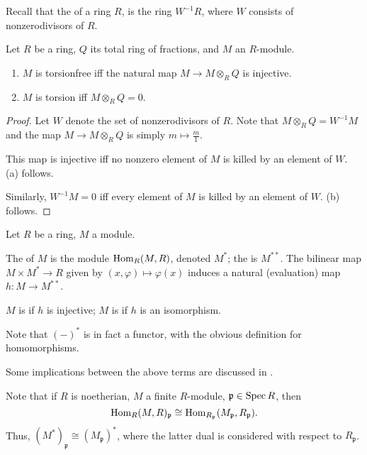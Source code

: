 \documentclass[12pt]{article}
\begin{document}
Recall that the  of a ring $R$, is the ring $W^{-1} R$, where $W$ consists of nonzerodivisors of $R$.
\begin{prop}
	Let $R$ be a ring, $Q$ its total ring of fractions, and $M$ an $R$-module.
	\begin{enumerate}[label=(\alph*)]
		\item $M$ is torsionfree iff the natural map $M \to M \otimes_{R} Q$ is injective.
		\item $M$ is torsion iff $M \otimes_{R} Q = 0$.
	\end{enumerate}
\end{prop}
\begin{proof} 
	Let $W$ denote the set of nonzerodivisors of $R$. Note that $M \otimes_{R} Q = W^{-1} M$ and the map $M \to M \otimes_{R} Q$ is simply $m \mapsto \frac{m}{1}$. 

	This map is injective iff no nonzero element of $M$ is killed by an element of $W$. (a) follows.

	Similarly, $W^{-1} M = 0$ iff every element of $M$ is killed by an element of $W$. (b) follows.
\end{proof}

\begin{defn}
	Let $R$ be a ring, $M$ a module. 

	The  of $M$ is the module $\operatorname{Hom}_{R}(M, R)$, denoted $M^{\ast}$; the  is $M^{\ast \ast}$. \newline
	The bilinear map $M \times M^{\ast} \to R$ given by $(x, \varphi) \mapsto \varphi(x)$ induces a natural (evaluation) map $h : M \to M^{\ast \ast}$. 

	$M$ is  if $h$ is injective; $M$ is  if $h$ is an isomorphism.
\end{defn}
Note that $(-)^{\ast}$ is in fact a functor, with the obvious definition for homomorphisms.

Some implications between the above terms are discussed in .

Note that if $R$ is noetherian, $M$ a finite $R$-module, $\mathfrak{p} \in \operatorname{Spec} R$, then
\begin{equation*} 
	\operatorname{Hom}_{R}(M, R)_{\mathfrak{p}} \cong \operatorname{Hom}_{R_{\mathfrak{p}}}(M_{\mathfrak{p}}, R_{\mathfrak{p}}).
\end{equation*}
Thus, $(M^{\ast})_{\mathfrak{p}} \cong (M_{\mathfrak{p}})^{\ast}$, where the latter dual is considered with respect to $R_{\mathfrak{p}}$. 
\end{document}
